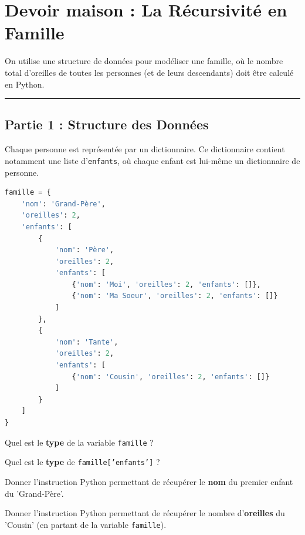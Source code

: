\section*{Devoir maison : La Récursivité en Famille}

On utilise une structure de données pour modéliser une famille, où le nombre total d'oreilles de toutes les personnes (et de leurs descendants) doit être calculé en Python.\\

\hrule

\subsection*{Partie 1 : Structure des Données}

Chaque personne est représentée par un dictionnaire. Ce dictionnaire contient notamment une liste d'\texttt{enfants}, où chaque enfant est lui-même un dictionnaire de personne.

\begin{lstlisting}[language=Python]
famille = {
    'nom': 'Grand-Père',
    'oreilles': 2,
    'enfants': [
        {
            'nom': 'Père',
            'oreilles': 2,
            'enfants': [
                {'nom': 'Moi', 'oreilles': 2, 'enfants': []},
                {'nom': 'Ma Soeur', 'oreilles': 2, 'enfants': []}
            ]
        },
        {
            'nom': 'Tante',
            'oreilles': 2,
            'enfants': [
                {'nom': 'Cousin', 'oreilles': 2, 'enfants': []}
            ]
        }
    ]
}
\end{lstlisting}

\begin{Exercise}[title={Variables et Accès}]

\Question Quel est le \textbf{type} de la variable \texttt{famille} ?\\

\emptybox{1cm}

\Question Quel est le \textbf{type} de \texttt{famille['enfants']} ?\\

\emptybox{1cm}

\Question Donner l'instruction Python permettant de récupérer le \textbf{nom} du premier enfant du 'Grand-Père'.\\

\emptybox{1cm}

\Question Donner l'instruction Python permettant de récupérer le nombre d'\textbf{oreilles} du 'Cousin' (en partant de la variable \texttt{famille}).\\

\emptybox{1cm}

\end{Exercise}


